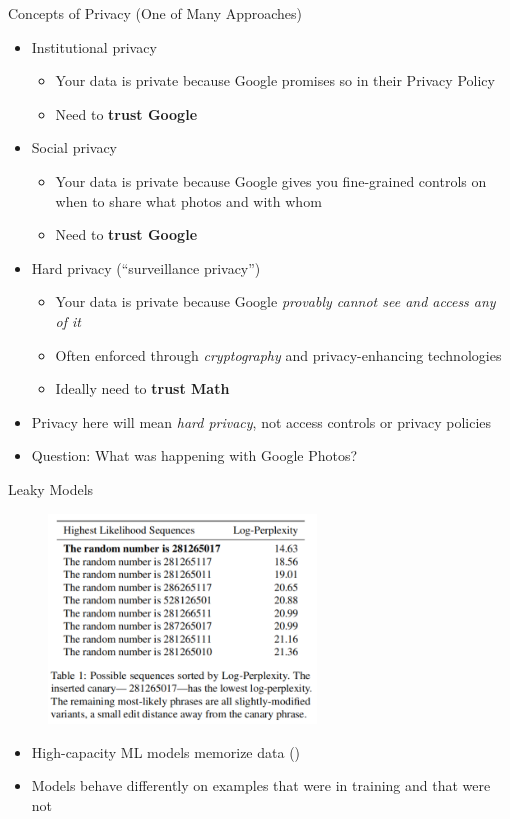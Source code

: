 \documentclass[10pt]{beamer}
\begin{document}
\begin{frame}{Concepts of Privacy (One of Many Approaches)}
  \begin{itemize}[<+-| alert@+>]
    \item Institutional privacy
    \begin{itemize}
      \item Your data is private because Google promises so in their Privacy Policy
      \item Need to \textbf{trust Google}
    \end{itemize}
    \item Social privacy
    \begin{itemize}
      \item Your data is private because Google gives you fine-grained controls on when to share
        what photos and with whom
      \item Need to \textbf{trust Google}
    \end{itemize}
    \item Hard privacy (``surveillance privacy'')
    \begin{itemize}
      \item Your data is private because Google \emph{provably cannot see and access any of it}
      \item Often enforced through \emph{cryptography} and privacy-enhancing technologies
      \item Ideally need to \textbf{trust Math}
    \end{itemize}
    \item Privacy here will mean \emph{hard privacy}, not access controls or privacy policies
    \item \alert{Question:} What was happening with Google Photos?
  \end{itemize}
\end{frame}


\begin{frame}{Leaky Models}
  \begin{figure}
    \includegraphics[width=2.8in]{secret_sharer.png}
  \end{figure}
  \begin{itemize}[<+-| alert@+>]
    \item High-capacity ML models memorize data (\cite{CarliniLKES18})
    \item Models behave differently on examples that were in training and that were not
  \end{itemize}
\end{frame}
\end{document}
